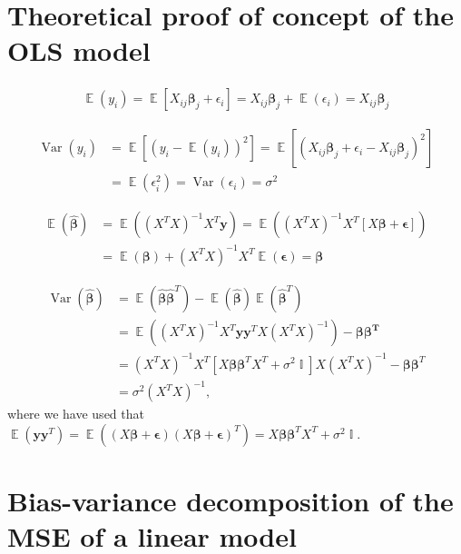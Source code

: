 \documentclass[twocolumn,english,notitlepage]{article}
\renewcommand{\vec}[1]{\boldsymbol{#1}}
\newcommand{\pclosed}[1]{\left(#1\right)}
\newcommand{\bclosed}[1]{\left[#1\right]}
\renewcommand{\expval}{\operatorname{\mathbb{E}}}
\renewcommand{\var}{\operatorname{Var}}
\DeclareMathOperator{\eye}{\mathbb{I}}
\newcommand{\betahat}{\hat{\beta}}
\begin{document}
\begin{appendix}
    \section{Theoretical proof of concept of the OLS model}
        \begin{align}
            \expval(y_i) = \expval\bclosed{X_{ij} \vec{\beta}_j + \epsilon_i} = X_{ij}\vec{\beta}_j + \expval(\epsilon_i) = X_{ij}\vec{\beta}_j
        \end{align}

        \begin{align} \nonumber
            \var(y_i) &= \expval\bclosed{\pclosed{y_i-\expval\pclosed{y_i}}^2} = \expval\bclosed{\pclosed{X_{ij}\vec{\beta}_j + \epsilon_i - X_{ij}\vec{\beta}_j}^2} \\
            &= \expval\pclosed{\epsilon_i^2} = \var\pclosed{\epsilon_i} = \sigma^2
        \end{align}

        \begin{align} \nonumber
            \expval(\vec{\betahat}) &= \expval\pclosed{(X^TX)^{-1}X^T \vec{y}} = \expval\pclosed{(X^TX)^{-1}X^T \bclosed{X\vec{\beta} + \vec{\epsilon}} } \\
            &= \expval\pclosed{\vec{\beta}} + {(X^TX)}^{-1}X^T \expval\pclosed{\vec{\epsilon}} = \vec{\beta}
        \end{align}

        \begin{align} \nonumber
            \var(\vec{\betahat}) &= \expval({\vec{\betahat} \vec{\betahat}^T}) - \expval({\vec{\betahat}}) \expval({\vec{\betahat}^T}) \\ \nonumber
            &= \expval((X^TX)^{-1}X^T \vec{y} \vec{y}^T X (X^TX)^{-1}) - \vec{\beta}\vec{\beta^T} \\ \nonumber
            &= (X^TX)^{-1}X^T \bclosed{X\vec{\beta}\vec{\beta}^TX^T + \sigma^2 \eye}X (X^TX)^{-1} - \vec{\beta}\vec{\beta}^T \\
            &= \sigma^2 (X^TX)^{-1},
        \end{align}
        where we have used that \(\expval(\vec{y}\vec{y}^T) = \expval\pclosed{(X\vec{\beta}+\vec{\epsilon})(X\vec{\beta}+\vec{\epsilon})^T} = X\vec{\beta}\vec{\beta}^TX^T + \sigma^2 \eye\).

    \section{Bias-variance decomposition of the MSE of a linear model}


\end{appendix}
\end{document}
